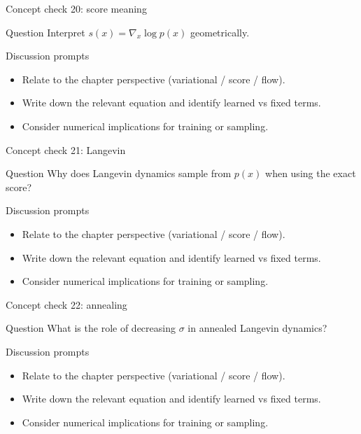 \documentclass[aspectratio=169]{beamer}
\begin{document}
\begin{frame}{Concept check 20: score meaning}
\begin{block}{Question}
Interpret \(s(x)=\nabla_x\log p(x)\) geometrically.
\end{block}
\begin{block}{Discussion prompts}
\begin{itemize}
\item Relate to the chapter perspective (variational / score / flow).
\item Write down the relevant equation and identify learned vs fixed terms.
\item Consider numerical implications for training or sampling.
\end{itemize}
\end{block}
\end{frame}

\begin{frame}{Concept check 21: Langevin}
\begin{block}{Question}
Why does Langevin dynamics sample from \(p(x)\) when using the exact score?
\end{block}
\begin{block}{Discussion prompts}
\begin{itemize}
\item Relate to the chapter perspective (variational / score / flow).
\item Write down the relevant equation and identify learned vs fixed terms.
\item Consider numerical implications for training or sampling.
\end{itemize}
\end{block}
\end{frame}

\begin{frame}{Concept check 22: annealing}
\begin{block}{Question}
What is the role of decreasing \(\sigma\) in annealed Langevin dynamics?
\end{block}
\begin{block}{Discussion prompts}
\begin{itemize}
\item Relate to the chapter perspective (variational / score / flow).
\item Write down the relevant equation and identify learned vs fixed terms.
\item Consider numerical implications for training or sampling.
\end{itemize}
\end{block}
\end{frame}
\end{document}
